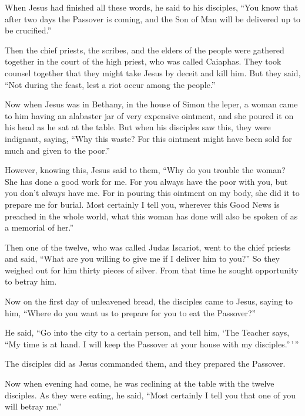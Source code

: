  When Jesus had finished all these words, he said to his
disciples,  ``You know that after two days the Passover is
coming, and the Son of Man will be delivered up to be crucified.''

 Then the chief priests, the scribes, and the elders of
the people were gathered together in the court of the high priest, who
was called Caiaphas.  They took counsel together that they
might take Jesus by deceit and kill him.  But they said,
``Not during the feast, lest a riot occur among the people.''

 Now when Jesus was in Bethany, in the house of Simon the
leper,  a woman came to him having an alabaster jar of
very expensive ointment, and she poured it on his head as he sat at the
table.  But when his disciples saw this, they were
indignant, saying, ``Why this waste?  For this ointment
might have been sold for much and given to the poor.''

 However, knowing this, Jesus said to them, ``Why do you
trouble the woman? She has done a good work for me.  For
you always have the poor with you, but you don't always have me.
 For in pouring this ointment on my body, she did it to
prepare me for burial.  Most certainly I tell you,
wherever this Good News is preached in the whole world, what this woman
has done will also be spoken of as a memorial of her.''

 Then one of the twelve, who was called Judas Iscariot,
went to the chief priests  and said, ``What are you
willing to give me if I deliver him to you?'' So they weighed out for
him thirty pieces of silver.  From that time he sought
opportunity to betray him.

 Now on the first day of unleavened bread, the disciples
came to Jesus, saying to him, ``Where do you want us to prepare for you
to eat the Passover?''

 He said, ``Go into the city to a certain person, and
tell him, `The Teacher says, ``My time is at hand. I will keep the
Passover at your house with my disciples.''\,'\,''

 The disciples did as Jesus commanded them, and they
prepared the Passover.

 Now when evening had come, he was reclining at the table
with the twelve disciples.  As they were eating, he said,
``Most certainly I tell you that one of you will betray me.''

